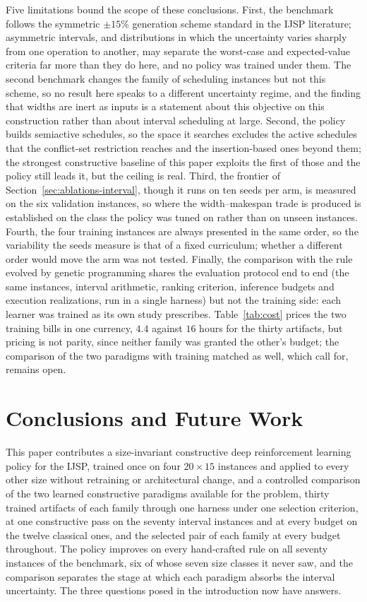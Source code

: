 \documentclass[preprint,12pt]{elsarticle}
\theoremstyle{definition}
\theoremstyle{remark}
\begin{document}
Five limitations bound the scope of these conclusions. First, the
benchmark follows the symmetric $\pm15\%$ generation scheme standard
in the IJSP literature; asymmetric intervals, and distributions in
which the uncertainty varies sharply from one operation to another,
may separate the worst-case and expected-value criteria far more
than they do here, and no policy was trained under them. The second
benchmark changes the family of scheduling instances but not this
scheme, so no result here speaks to a different uncertainty regime,
and the finding that widths are inert as inputs is a statement about
this objective on this construction rather than about interval
scheduling at large. Second, the
policy builds semiactive schedules, so the space it searches excludes
the active schedules that the conflict-set restriction reaches and
the insertion-based ones beyond them; the strongest constructive
baseline of this paper exploits the first of those and the policy
still leads it, but the ceiling is real. Third, the frontier of Section~\ref{sec:ablations-interval}, though
it runs on ten seeds per arm, is measured on the six validation
instances, so where the width--makespan trade is produced is
established on the class the policy was tuned on rather than on
unseen instances. Fourth, the four training instances are
always presented in the same order, so the variability the seeds
measure is that of a fixed curriculum; whether a different order
would move the arm was not tested. Finally, the comparison with the rule evolved by
genetic programming shares the evaluation protocol end to end (the
same instances, interval arithmetic, ranking criterion, inference
budgets and execution realizations, run in a single harness) but not
the training side: each learner was trained as its own study
prescribes. Table~\ref{tab:cost} prices the two training bills in one
currency, $4.4$ against $16$ hours for the thirty artifacts, but
pricing is not parity, since neither family was granted the other's
budget; the comparison of the two paradigms with training matched as
well, which \citet{Xu2025} call for, remains open.

\FloatBarrier
\section{Conclusions and Future Work}
\label{sec:conclusions}

This paper contributes a size-invariant constructive deep
reinforcement learning policy for the IJSP, trained once on four
$20{\times}15$ instances and applied to every other size without
retraining or architectural change, and a controlled comparison of
the two learned constructive paradigms available for the problem,
thirty trained artifacts of each family through one harness under one
selection criterion, at one constructive pass on the seventy interval
instances and at every budget on the twelve classical ones, and the
selected pair of each family at every budget throughout. The
policy improves on every hand-crafted rule on all seventy instances
of the benchmark, six of whose seven size classes it never saw, and
the comparison separates the stage at which each paradigm absorbs the
interval uncertainty. The three questions posed in the introduction
now have answers.
\end{document}
